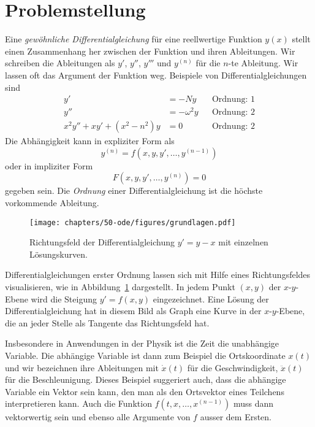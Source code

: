%
%
%
\section{Problemstellung
\label{buch:section:dglproblemstellung}}
Eine {\em gewöhnliche Differentialgleichung} für eine reellwertige
%
Funktion $y(x)$ stellt einen Zusammenhang her zwischen der Funktion
und ihren Ableitungen.
%
%
Wir schreiben die Ableitungen als $y'$, $y''$, $y'''$ und $y^{(n)}$
für die $n$-te Ableitung.
Wir lassen oft das Argument der Funktion weg.
Beispiele von Differentialgleichungen sind
\begin{align*}
y'&=-Ny
&&\text{Ordnung: $1$}
\\
y''&=-\omega^2 y
&&\text{Ordnung: $2$}
\\
x^2y''+xy'+(x^2-n^2)y&=0
&&\text{Ordnung: $2$}
\end{align*}
Die Abhängigkeit kann in expliziter Form als
%
%
\begin{equation}
y^{(n)}=f(x,y,y',\dots,y^{(n-1)})
\label{grundlagen:explizit}
\end{equation}
oder in impliziter Form
%
%
\[
F(x,y,y',\dots,y^{(n)})=0
\]
gegeben sein.
Die {\em Ordnung} einer Differentialgleichung ist die höchste vorkommende
Ableitung.
%

\begin{figure}
\centering
\texttt{[image: chapters/50-ode/figures/grundlagen.pdf]}
\caption{Richtungsfeld der Differentialgleichung $y'=y-x$ mit
einzelnen Lösungskurven.
\label{grundlagen:richtungsfeld}}
\end{figure}%

Differentialgleichungen erster Ordnung lassen sich mit Hilfe eines
Richtungsfeldes visualisieren, wie in Abbildung~\ref{grundlagen:richtungsfeld}
dargestellt.
%
In jedem Punkt $(x,y)$ der $x$-$y$-Ebene wird die Steigung $y'=f(x,y)$
eingezeichnet.
Eine Lösung der Differentialgleichung hat in diesem Bild als Graph
eine Kurve in der $x$-$y$-Ebene, die an jeder Stelle als Tangente 
das Richtungsfeld hat.

Insbesondere in Anwendungen in der Physik ist die Zeit die
unabhängige Variable.
Die abhängige Variable ist dann zum Beispiel die Ortskoordinate
$x(t)$ und wir bezeichnen ihre Ableitungen mit $\dot{x}(t)$ für
die Geschwindigkeit, $\ddot{x}(t)$ für die Beschleunigung.
Dieses Beispiel suggeriert auch, dass die abhängige Variable 
ein Vektor sein kann, den man als den Ortsvektor eines Teilchens
interpretieren kann.
%
%
%
Auch die Funktion $f(t,x,\dots,x^{(n-1)})$ muss dann vektorwertig sein und
ebenso alle Argumente von $f$ ausser dem Ersten.

